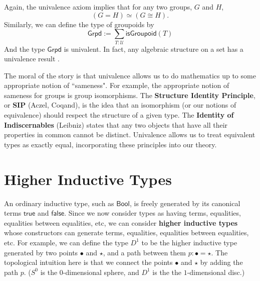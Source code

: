 \documentclass{amsart}
\theoremstyle{definition}
\newcommand{\Bool}{\ensuremath{\mathsf{Bool}}}
\newcommand{\isGroupoid}{\ensuremath{\mathsf{isGroupoid}}}
\newcommand{\Grpd}{\ensuremath{\mathsf{Grpd}}}
\newcommand{\U}{\ensuremath{\mathcal{U}}}
\newcommand{\True}{\ensuremath{\mathsf{true}}}
\newcommand{\False}{\ensuremath{\mathsf{false}}}
\renewcommand{\emph}{\textbf}
\begin{document}

Again, the univalence axiom implies that for any two groups, $G$ and $H$,
\[(G = H)\simeq (G \cong H).\]
Similarly, we can define the type of groupoids by
\[\Grpd:= \sum_{T:\U} \isGroupoid(T)\]
And the type $\Grpd$ is univalent.
In fact, any algebraic structure on a set has a univalence result \cite{coq:isomorphism-is-equality}.


The moral of the story is that univalence allows us to do mathematics up to some appropriate notion of ``sameness".
For example, the appropriate notion of sameness for groups is group isomorphisms.
The \textbf{Structure Identity Principle}, or \textbf{SIP} (Aczel, Coqand), is the idea that an isomorphism (or our notions of equivalence) should respect the structure of a given type.
The \textbf{Identity of Indiscernables} (Leibniz) states that any two objects that have all their properties in common cannot be distinct.
Univalence allows us to treat equivalent types as exactly equal, incorporating these principles into our theory.

\section{Higher Inductive Types}
An ordinary inductive type, such as $\Bool$, is freely generated by its canonical terms $\True$ and $\False$.
Since we now consider types as having terms, equalities, equalities between equalities, etc, we can consider \emph{higher inductive types} whose constructors can generate terms, equalities, equalities between equalities, etc.
For example, we can define the type $D^{1}$ to be the higher inductive type generated by two points $\bullet$ and $\star$, and a path between them $p : \bullet = \star$.
The topological intuition here is that we connect the points $\bullet$ and $\star$ by adding the path $p$. 
($S^0$ is the $0$-dimensional sphere, and $D^1$ is the the $1$-dimensional disc.)
\end{document}
